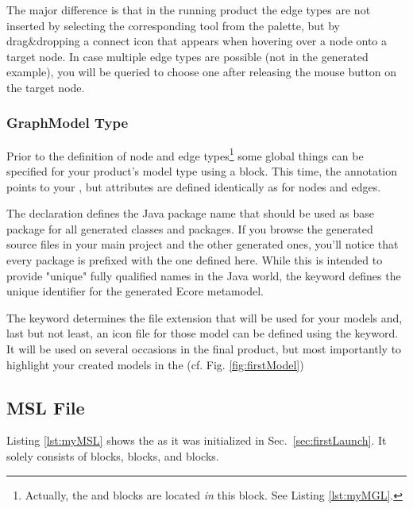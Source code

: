 \documentclass[a4paper,american,12pt]{scrreprt}
\begin{document}
The major difference is that in the running \cinco product the edge types are
not inserted by selecting the corresponding tool from the palette, but by
drag\&dropping a connect icon that appears when hovering over a node onto a
target node. In case multiple edge types are possible (not in the generated
example), you will be queried to choose one after releasing the mouse button on
the target node.

\subsubsection{GraphModel Type}

Prior to the definition of node and edge types\footnote{Actually, the 
and  blocks are located \emph{in} this  block. See
Listing \ref{lst:myMGL}.} some global things can be specified for your \cinco
product's model type using a   block.  This time,
the  annotation points to your , but
attributes are defined identically as for nodes and edges.

The  declaration defines the Java package name that should be used
as base package for all generated classes and packages. If you browse the
generated source files in your main project and the other generated ones, you'll
notice that every package is prefixed with the one defined here. While this is
intended to provide "unique" fully qualified names in the Java world, the
 keyword defines the unique identifier for the generated Ecore
metamodel.

The  keyword determines the file extension that will be
used for your models and, last but not least, an icon file for those model can
be defined using the  keyword. It will be used on several occasions
in the final product, but most importantly to highlight your created models in
the  (cf. Fig. \ref{fig:firstModel}) 

\subsection{MSL File} \label{sec:msl}


Listing \ref{lst:myMSL} shows the  as it was initialized
in Sec.~\ref{sec:firstLaunch}. It solely consists of 
 blocks,   blocks, and 
 blocks.
\end{document}
